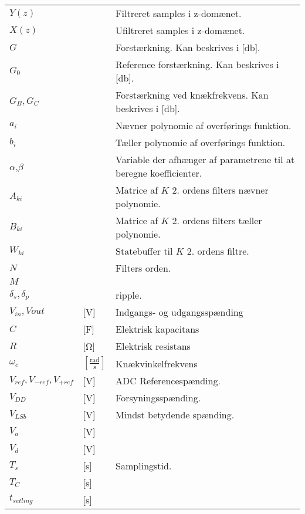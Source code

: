 \begin{table}[h!]
\begin{threeparttable}
\begin{tabular}{l l l}
$Y(z)$\tnote{*}	    &		            & Filtreret samples i z-domænet.	\\
$X(z)$\tnote{*}	    &		            & Ufiltreret samples i  z-domænet.	\\
$G$\tnote{*}		&   				& Forstærkning. Kan beskrives i [\si{\decibel}].\\
$G_0$\tnote{*}		&   				& Reference forstærkning. Kan beskrives i [\si{\decibel}].\\
$G_B,G_C$\tnote{*}	&   				& Forstærkning ved knækfrekvens. Kan beskrives i [\si{\decibel}].\\
$a_i$\tnote{*}	    &   				& Nævner polynomie af overførings funktion.\\
$b_i$\tnote{*}	    &   				& Tæller polynomie af overførings funktion.\\
$\alpha$\tnote{*},$\beta$\tnote{*}	    &   			& Variable der afhænger af parametrene til at beregne koefficienter.\\
$A_{ki}$\tnote{*}	    &   			& Matrice af $K$ 2. ordens filters nævner polynomie.\\
$B_{ki}$\tnote{*}	    &   			& Matrice af $K$ 2. ordens filters tæller polynomie.\\
$W_{ki}$\tnote{*}	    &   			& Statebuffer til $K$ 2. ordens filtre.\\
$N$\tnote{*}        &                   & Filters orden.\\
$M$\tnote{*}        &                   & \\   
$\delta_s, \delta_p$\tnote{*}	&   				& ripple.\\
$V_{in},V{out}$ & [\si{\volt}] & Indgangs- og udgangsspænding\\
$C$ & [\si{\farad}] & Elektrisk kapacitans \\
$R$ & [\si{\ohm}] & Elektrisk resistans \\
$\omega _c$ & $[\frac{\si{\radian}}{\si{\second}}]$ & Knækvinkelfrekvens \\
$V_{ref},V_{-ref},V_{+ref}$ & [\si{\volt}] & ADC Referencespænding. \\
$V_{DD}$ & [\si{\volt}] & Forsyningsspænding. \\
$V_{LSb}$ & [\si{\volt}] & Mindst betydende spænding. \\
$V_a$ &[\si{\volt}] & \\
$V_d$ & [\si{\volt}]& \\
$T_s$ & [\si{\second}] & Samplingstid. \\
$T_C$ &[\si{\second}] & \\
$t_{setling}$ &[\si{\second}] & \\

\end{tabular}
\end{threeparttable}
\end{table}
